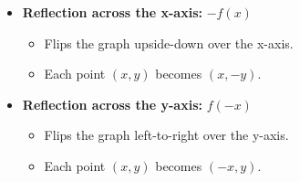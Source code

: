 \begin{itemize}
    \item \textbf{Reflection across the x-axis:} \( -f(x) \)
    \begin{itemize}
        \item Flips the graph upside-down over the x-axis.
        \item Each point \( (x, y) \) becomes \( (x, -y) \).
    \end{itemize}

    \item \textbf{Reflection across the y-axis:} \( f(-x) \)
    \begin{itemize}
        \item Flips the graph left-to-right over the y-axis.
        \item Each point \( (x, y) \) becomes \( (-x, y) \).
    \end{itemize}
\end{itemize}

\newpage